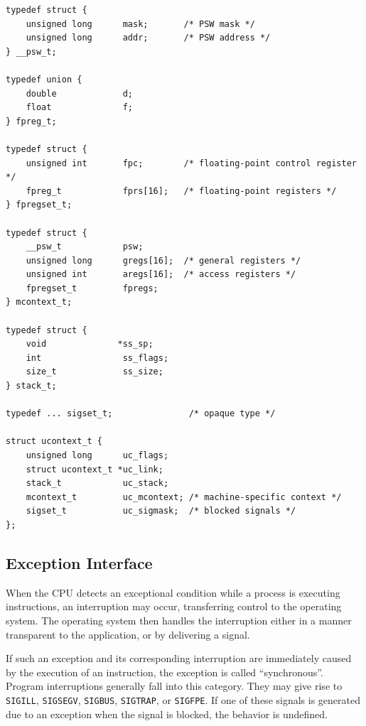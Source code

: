 \documentclass[USenglish,fontsize=11pt,twoside,%
  toc=bib,toc=idx,toc=graduated,numbers=noendperiod,
  bookmarks=true,
  bookmarksnumbered=true,
  bookmarksopen=true,
  bookmarksopenlevel=1,
  breaklinks=true,
  colorlinks=true,
  linkcolor=black,
  pdfpagelayout={TwoPageRight},
  pdfusetitle=true
]{scrreprt}
\begin{document}
\begin{lstlisting}[style=float,caption={[The \texttt{ucontext\_t}
    structure]The \texttt{ucontext\_t} structure.  The size of
    \texttt{uc\_sigmask} may vary, and additional information may be
    stored after it.},label={lst:ucontext}]
typedef struct {
    unsigned long      mask;       /* PSW mask */
    unsigned long      addr;       /* PSW address */
} __psw_t;

typedef union {
    double             d;
    float              f;
} fpreg_t;

typedef struct {
    unsigned int       fpc;        /* floating-point control register */
    fpreg_t            fprs[16];   /* floating-point registers */
} fpregset_t;

typedef struct {
    __psw_t            psw;
    unsigned long      gregs[16];  /* general registers */
    unsigned int       aregs[16];  /* access registers */
    fpregset_t         fpregs;
} mcontext_t;

typedef struct {
    void              *ss_sp;
    int                ss_flags;
    size_t             ss_size;
} stack_t;

typedef ... sigset_t;               /* opaque type */

struct ucontext_t {
    unsigned long      uc_flags;
    struct ucontext_t *uc_link;
    stack_t            uc_stack;
    mcontext_t         uc_mcontext; /* machine-specific context */
    sigset_t           uc_sigmask;  /* blocked signals */
};
\end{lstlisting}

\subsection{Exception Interface}
\label{exceptionint}
When the CPU detects an exceptional condition while a process is executing
instructions, an interruption may occur, transferring
control to the operating system.  The operating system then handles the
interruption either in a manner transparent to the application, or by
delivering a signal.

If such an exception and its corresponding interruption are immediately
caused by the execution of an instruction, the exception is called
``synchronous''.  Program interruptions generally fall into this category.
They may give rise to \texttt{SIGILL}, \texttt{SIGSEGV}, \texttt{SIGBUS},
\texttt{SIGTRAP}, or \texttt{SIGFPE}\@.  If one of these signals is
generated due to an exception when the signal is blocked, the behavior is
undefined.
\end{document}
